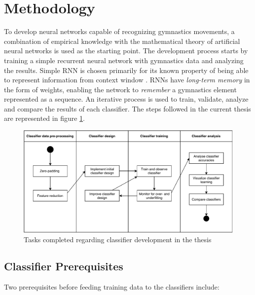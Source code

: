 \section{Methodology}

To develop neural networks capable of recognizing gymnastics movements, a combination of empirical knowledge with the mathematical theory of artificial neural networks is used as the starting point. The development process starts by training a simple recurrent neural network with gymnastics data and analyzing the results. Simple RNN is chosen primarily for its known property of being able to represent information from context window \cite{DBLP:journals/corr/Lipton15}. RNNs have \textit{long-term memory} in the form of weights, enabling the network to \textit{remember} a gymnastics element represented as a sequence. An iterative process is used to train, validate, analyze and compare the results of each classifier. The steps followed in the current thesis are represented in figure \ref{classifier-tasks}.

\begin{figure}[htb]
  \centering
    \includegraphics[width=\textwidth,keepaspectratio]
    {images/classifier/classifier-tasks}
    \caption{Tasks completed regarding classifier development in the thesis}
    \label{classifier-tasks}
\end{figure}

\subsection{Classifier Prerequisites}

Two prerequisites before feeding training data to the classifiers include:

